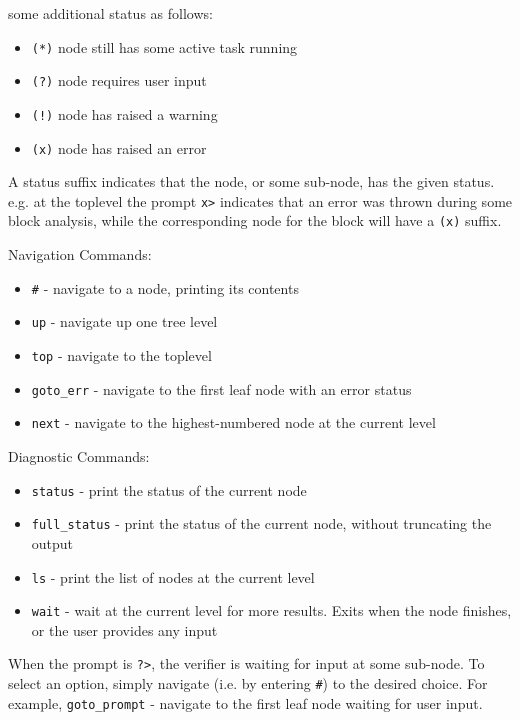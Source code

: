 some additional status as follows:
\begin{itemize}
\item \texttt{(*)} node still has some active task running
\item \texttt{(?)} node requires user input
\item \texttt{(!)} node has raised a warning
\item \texttt{(x)} node has raised an error
\end{itemize}
A status suffix indicates that the node, or some sub-node, has the given status.
e.g. at the toplevel the prompt \texttt{x>} indicates that an error was thrown during
some block analysis, while the corresponding node for the block will have a \texttt{(x)} suffix.

Navigation Commands:
\begin{itemize}
\item \texttt{\#} - navigate to a node, printing its contents
\item \texttt{up} - navigate up one tree level
\item \texttt{top} - navigate to the toplevel
\item \texttt{goto\_err} - navigate to the first leaf node with an error status
\item \texttt{next} - navigate to the highest-numbered node at the current level
\end{itemize}
Diagnostic Commands:
\begin{itemize}
\item \texttt{status} - print the status of the current node
\item \texttt{full\_status} - print the status of the current node, without truncating the output
\item \texttt{ls} - print the list of nodes at the current level
\item \texttt{wait} - wait at the current level for more results. Exits when the node finishes, or
the user provides any input
\end{itemize}
When the prompt is \texttt{?>}, the verifier is waiting for input at some sub-node.
To select an option, simply navigate (i.e. by entering \texttt{\#}) to
the desired choice.  For example, \texttt{goto\_prompt} - navigate to the
first leaf node waiting for user input. 


